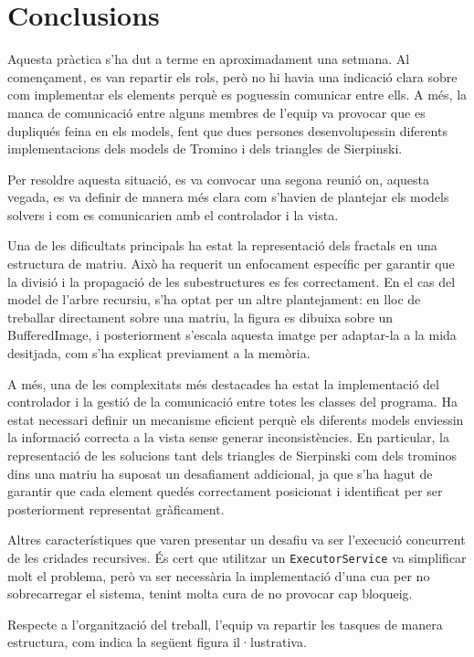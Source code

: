 \documentclass{ieeetj}
\begin{document}
\section{Conclusions}  
Aquesta pràctica s’ha dut a terme en aproximadament una setmana. Al començament, es van repartir els rols, però no hi havia una indicació clara sobre com implementar els elements perquè es poguessin comunicar entre ells. A més, la manca de comunicació entre alguns membres de l’equip va provocar que es dupliqués feina en els models, fent que dues persones desenvolupessin diferents implementacions dels models de Tromino i dels triangles de Sierpinski.

Per resoldre aquesta situació, es va convocar una segona reunió on, aquesta vegada, es va definir de manera més clara com s’havien de plantejar els models solvers i com es comunicarien amb el controlador i la vista.

Una de les dificultats principals ha estat la representació dels fractals en una estructura de matriu. Això ha requerit un enfocament específic per garantir que la divisió i la propagació de les subestructures es fes correctament. En el cas del model de l'arbre recursiu, s'ha optat per un altre plantejament: en lloc de treballar directament sobre una matriu, la figura es dibuixa sobre un BufferedImage, i posteriorment s'escala aquesta imatge per adaptar-la a la mida desitjada, com s'ha explicat previament a la memòria.

A més, una de les complexitats més destacades ha estat la implementació del controlador i la gestió de la comunicació entre totes les classes del programa. Ha estat necessari definir un mecanisme eficient perquè els diferents models enviessin la informació correcta a la vista sense generar inconsistències. En particular, la representació de les solucions tant dels triangles de Sierpinski com dels trominos dins una matriu ha suposat un desafiament addicional, ja que s’ha hagut de garantir que cada element quedés correctament posicionat i identificat per ser posteriorment representat gràficament.

Altres característiques que varen presentar un desafiu va ser l'execució concurrent de les cridades recursives. És cert que utilitzar un \texttt{ExecutorService} va simplificar molt el problema, però va ser necessària la implementació d'una cua per no sobrecarregar el sistema, tenint molta cura de no provocar cap bloqueig.

Respecte a l'organització del treball, l'equip va repartir les tasques de manera estructura, com indica la següent figura il·lustrativa.
\end{document}
